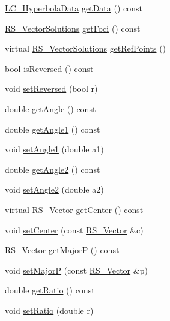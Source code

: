 \begin{DoxyCompactItemize}
\item 
\hyperlink{classLC__HyperbolaData}{L\-C\-\_\-\-Hyperbola\-Data} \hyperlink{classLC__Hyperbola_ac9bcb850987c206940f6122ce7c71a99}{get\-Data} () const 
\item 
\hyperlink{classRS__VectorSolutions}{R\-S\-\_\-\-Vector\-Solutions} \hyperlink{classLC__Hyperbola_a8947d4a95a80ae87b92bb5b48dae72d5}{get\-Foci} () const 
\item 
virtual \hyperlink{classRS__VectorSolutions}{R\-S\-\_\-\-Vector\-Solutions} \hyperlink{classLC__Hyperbola_a45c431ea6bbcceedb2ef4c5a5b3b090e}{get\-Ref\-Points} ()
\item 
bool \hyperlink{classLC__Hyperbola_ad18ca70c490dbf236dfe6cbffe261d92}{is\-Reversed} () const 
\item 
void \hyperlink{classLC__Hyperbola_adae0a21fbb01097364136ead47c98894}{set\-Reversed} (bool r)
\item 
double \hyperlink{classLC__Hyperbola_a8e15ac1636a5c296f3d4041c558ba86d}{get\-Angle} () const 
\item 
double \hyperlink{classLC__Hyperbola_a59bf3afede1290f9679834a224b9f2ab}{get\-Angle1} () const 
\item 
void \hyperlink{classLC__Hyperbola_a55f0ebf4887034a3d628124d54f86543}{set\-Angle1} (double a1)
\item 
double \hyperlink{classLC__Hyperbola_a72af2f715f808de9a54249ab9b9cf06a}{get\-Angle2} () const 
\item 
void \hyperlink{classLC__Hyperbola_a6c70c2f5c1d8da8ff893f314b88bf08c}{set\-Angle2} (double a2)
\item 
virtual \hyperlink{classRS__Vector}{R\-S\-\_\-\-Vector} \hyperlink{classLC__Hyperbola_aae9e7188ad4fa98018a0fc5bda9bd7fa}{get\-Center} () const 
\item 
void \hyperlink{classLC__Hyperbola_a753d89c4601e6a42bc2b7d0851c41f81}{set\-Center} (const \hyperlink{classRS__Vector}{R\-S\-\_\-\-Vector} \&c)
\item 
\hyperlink{classRS__Vector}{R\-S\-\_\-\-Vector} \hyperlink{classLC__Hyperbola_a3544a67eafeb22bbbc1d057e862a2c51}{get\-Major\-P} () const 
\item 
void \hyperlink{classLC__Hyperbola_a05aff176891e9cf094948b374699270f}{set\-Major\-P} (const \hyperlink{classRS__Vector}{R\-S\-\_\-\-Vector} \&p)
\item 
double \hyperlink{classLC__Hyperbola_aec52aeaf7e2fabd60b17bb6d180c6391}{get\-Ratio} () const 
\item 
void \hyperlink{classLC__Hyperbola_af3ab219c907e4b76927500dea28ffd87}{set\-Ratio} (double r)

\end{DoxyCompactItemize}
